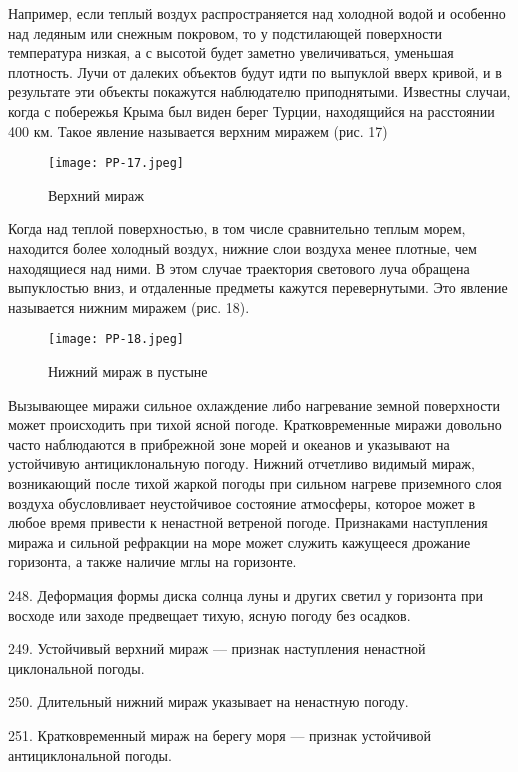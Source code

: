 Например, если теплый воздух распространяется над холодной водой и особенно над ледяным или снежным покровом, то у подстилающей поверхности температура низкая, а с высотой будет заметно увеличиваться, уменьшая плотность. Лучи от далеких объектов будут идти по выпуклой вверх кривой, и в результате эти объекты покажутся наблюдателю приподнятыми. Известны случаи, когда с побережья Крыма был виден берег Турции, находящийся на расстоянии 400 км. Такое явление называется верхним миражем (рис. 17)

\begin{figure}[htb]
  \centering{}
  \texttt{[image: PP-17.jpeg]}
  \caption{Верхний мираж}
  \label{fig:pp17}
  \small
  \centering{}
\end{figure}

Когда над теплой поверхностью, в том числе сравнительно теплым морем, находится более холодный воздух, нижние слои воздуха менее плотные, чем находящиеся над ними. В этом случае траектория светового луча обращена выпуклостью вниз, и отдаленные предметы кажутся перевернутыми. Это явление называется нижним миражем (рис. 18).

\begin{figure}[htb]
  \centering{}
  \texttt{[image: PP-18.jpeg]}
  \caption{Нижний мираж в пустыне}
  \label{fig:pp18}
  \small
  \centering{}
\end{figure}

Вызывающее миражи сильное охлаждение либо нагревание земной поверхности может происходить при тихой ясной погоде. Кратковременные миражи довольно часто наблюдаются в прибрежной зоне морей и океанов и указывают на устойчивую антициклональную погоду. Нижний отчетливо видимый мираж, возникающий после тихой жаркой погоды при сильном нагреве приземного слоя воздуха обусловливает неустойчивое состояние атмосферы, которое может в любое время привести к ненастной ветреной погоде. Признаками наступления миража и сильной рефракции на море может служить кажущееся дрожание горизонта, а также наличие мглы на горизонте.

248. Деформация формы диска солнца луны и других светил у горизонта при восходе или заходе предвещает тихую, ясную погоду без осадков.

249. Устойчивый верхний мираж — признак наступления ненастной циклональной погоды.

250. Длительный нижний мираж указывает на ненастную погоду.

251. Кратковременный мираж на берегу моря — признак устойчивой антициклональной погоды.

